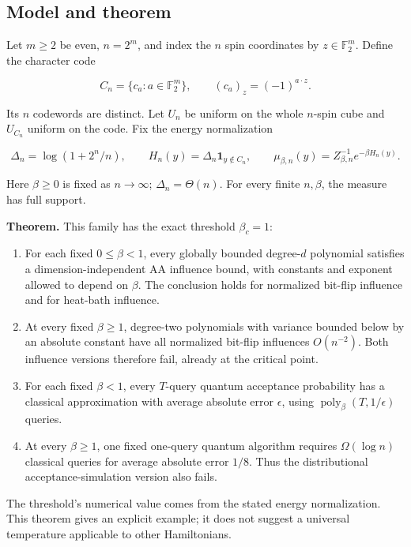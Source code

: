 \subsection{Model and theorem}\label{qm:model-and-theorem}

Let \(m\ge2\) be even, \(n=2^m\), and index the \(n\) spin coordinates by \(z\in\mathbb F_2^m\). Define the character code

\[
C_n=\{c_a:a\in\mathbb F_2^m\},\qquad (c_a)_z=(-1)^{a\cdot z}.
\]

Its \(n\) codewords are distinct. Let \(U_n\) be uniform on the whole \(n\)-spin cube and \(U_{C_n}\) uniform on the code. Fix the energy normalization

\[
\Delta_n=\log(1+2^n/n),\qquad H_n(y)=\Delta_n\mathbf1_{y\notin C_n},
\qquad\mu_{\beta,n}(y)=Z_{\beta,n}^{-1}e^{-\beta H_n(y)}.
\]

Here \(\beta\ge0\) is fixed as \(n\to\infty\); \(\Delta_n=\Theta(n)\). For every finite \(n,\beta\), the measure has full support.

\textbf{Theorem.} This family has the exact threshold \(\beta_c=1\):

\begin{enumerate}
\def\labelenumi{\arabic{enumi}.}
\tightlist
\item
  For each fixed \(0\le\beta<1\), every globally bounded degree-\(d\) polynomial satisfies a dimension-independent AA influence bound, with constants and exponent allowed to depend on \(\beta\). The conclusion holds for normalized bit-flip influence and for heat-bath influence.
\item
  At every fixed \(\beta\ge1\), degree-two polynomials with variance bounded below by an absolute constant have all normalized bit-flip influences \(O(n^{-2})\). Both influence versions therefore fail, already at the critical point.
\item
  For each fixed \(\beta<1\), every \(T\)-query quantum acceptance probability has a classical approximation with average absolute error \(\epsilon\), using \(\operatorname{poly}_{\beta}(T,1/\epsilon)\) queries.
\item
  At every \(\beta\ge1\), one fixed one-query quantum algorithm requires \(\Omega(\log n)\) classical queries for average absolute error \(1/8\). Thus the distributional acceptance-simulation version also fails.
\end{enumerate}

The threshold's numerical value comes from the stated energy normalization. This theorem gives an explicit example; it does not suggest a universal temperature applicable to other Hamiltonians.
